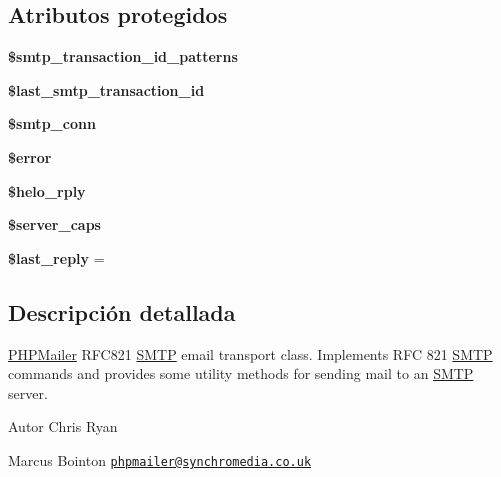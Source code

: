 \subsection*{Atributos protegidos}
\begin{DoxyCompactItemize}
\item 
{\bfseries \$smtp\+\_\+transaction\+\_\+id\+\_\+patterns}
\item 
\mbox{\label{classPHPMailer_1_1PHPMailer_1_1SMTP_a153880c002bd516d6c148cee78d49d93}} 
{\bfseries \$last\+\_\+smtp\+\_\+transaction\+\_\+id}
\item 
\mbox{\label{classPHPMailer_1_1PHPMailer_1_1SMTP_abaa18a03893b06f7c6cdb8c8fdfe642c}} 
{\bfseries \$smtp\+\_\+conn}
\item 
{\bfseries \$error}
\item 
\mbox{\label{classPHPMailer_1_1PHPMailer_1_1SMTP_acc6db4b35fbcb4fe4d726654cdec5870}} 
{\bfseries \$helo\+\_\+rply}
\item 
\mbox{\label{classPHPMailer_1_1PHPMailer_1_1SMTP_a8b7b4ca3f7c75ef0b76a8f09bd87e8be}} 
{\bfseries \$server\+\_\+caps}
\item 
\mbox{\label{classPHPMailer_1_1PHPMailer_1_1SMTP_a85c8f6d36dc8e00141f0b450fa754e2f}} 
{\bfseries \$last\+\_\+reply} = \textquotesingle{}\textquotesingle{}
\end{DoxyCompactItemize}


\subsection{Descripción detallada}
\hyperlink{classPHPMailer_1_1PHPMailer_1_1PHPMailer}{P\+H\+P\+Mailer} R\+F\+C821 \hyperlink{classPHPMailer_1_1PHPMailer_1_1SMTP}{S\+M\+TP} email transport class. Implements R\+FC 821 \hyperlink{classPHPMailer_1_1PHPMailer_1_1SMTP}{S\+M\+TP} commands and provides some utility methods for sending mail to an \hyperlink{classPHPMailer_1_1PHPMailer_1_1SMTP}{S\+M\+TP} server.

\begin{DoxyAuthor}{Autor}
Chris Ryan 

Marcus Bointon \href{mailto:phpmailer@synchromedia.co.uk}{\tt phpmailer@synchromedia.\+co.\+uk} 
\end{DoxyAuthor}


